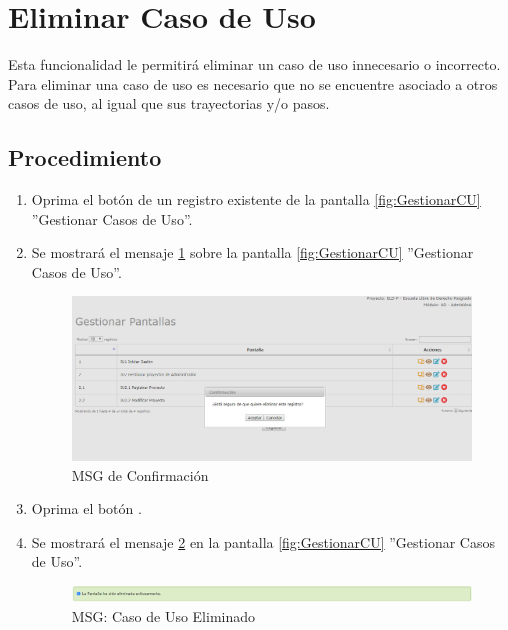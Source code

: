 \hypertarget{cv:eliminarCU}{\section{Eliminar Caso de Uso}} \label{sec:eliminarCU}

	Esta funcionalidad le permitirá eliminar un caso de uso innecesario o incorrecto. Para eliminar una caso de uso es necesario que no se encuentre asociado a otros casos de uso, al igual que sus trayectorias y/o pasos.

		\subsection{Procedimiento}

			\begin{enumerate}
	
			\item Oprima el botón \IUBotonEliminar{} de un registro existente de la pantalla \ref{fig:GestionarCU} ''Gestionar Casos de Uso''.
	
			\item Se mostrará el mensaje \ref{fig:confirmaEliminaCU} sobre la pantalla \ref{fig:GestionarCU} ''Gestionar Casos de Uso''.
			
			\begin{figure}[htbp!]
				\begin{center}
					\includegraphics[scale=0.5]{roles/lider/casosUso/pantallas/IU11-3MSG10}
					\caption{MSG de Confirmación}
					\label{fig:confirmaEliminaCU}
				\end{center}
			\end{figure}
						
			\item Oprima el botón \IUAceptar.
			
			\item Se mostrará el mensaje \ref{fig:CUEliminado} en la pantalla \ref{fig:GestionarCU} ''Gestionar Casos de Uso''.
			
			\begin{figure}[htbp!]
				\begin{center}
					\includegraphics[scale=0.5]{roles/lider/pantallas/pantallas/IU11-3MSG1}
					\caption{MSG: Caso de Uso Eliminado}
					\label{fig:CUEliminado}
				\end{center}
			\end{figure}
			\end{enumerate}